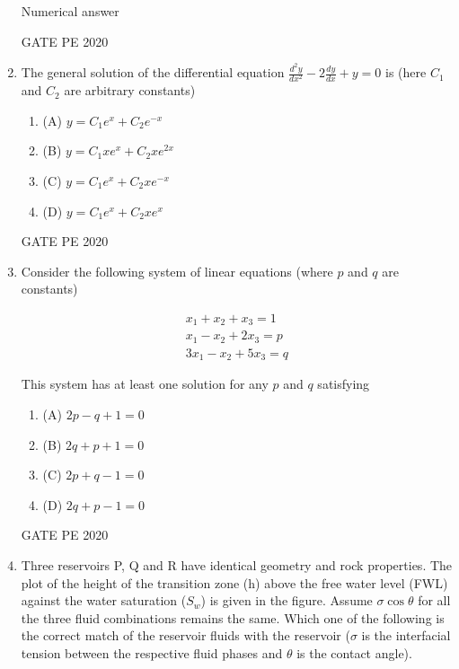 \documentclass[journal,12pt,onecolumn]{IEEEtran}
\theoremstyle{remark}
\begin{document}
\begin{enumerate}
   Numerical answer

  \hfill{GATE PE 2020}

   



\item The general solution of the differential equation $\frac{d^2 y}{dx^2} - 2 \frac{dy}{dx} + y = 0$ is (here $C_1$ and $C_2$ are arbitrary constants)

\begin{multicols}{2}
\begin{enumerate}
\item (A) $y = C_1 e^x + C_2 e^{-x}$
\item (B) $y = C_1 xe^x + C_2 xe^{2x}$
\item (C) $y = C_1 e^x + C_2 xe^{-x}$
\item (D) $y = C_1 e^x + C_2 xe^x$
\end{enumerate}
\end{multicols}


  \hfill{GATE PE 2020}
   
\item Consider the following system of linear equations (where $p$ and $q$ are constants)


\begin{align}
x_1 + x_2 + x_3 = 1 \\
x_1 - x_2 + 2x_3 = p \\
3x_1 - x_2 + 5x_3 = q
\end{align}


This system has at least one solution for any $p$ and $q$ satisfying

  
\begin{multicols}{2}
\begin{enumerate}
\item (A) $2p - q + 1 = 0$
\item (B) $2q + p + 1 = 0$
\item (C) $2p + q - 1 = 0$
\item (D) $2q + p - 1 = 0$
\end{enumerate}
\end{multicols}


  \hfill{GATE PE 2020}
   
\item Three reservoirs P, Q and R have identical geometry and rock properties. The plot of the height of the transition zone (h) above the free water level (FWL) against the water saturation ($S_w$) is given in the figure. Assume $\sigma \cos \theta$ for all the three fluid combinations remains the same. Which one of the following is the correct match of the reservoir fluids with the reservoir ($\sigma$ is the interfacial tension between the respective fluid phases and $\theta$ is the contact angle).


\end{enumerate}
\end{document}
